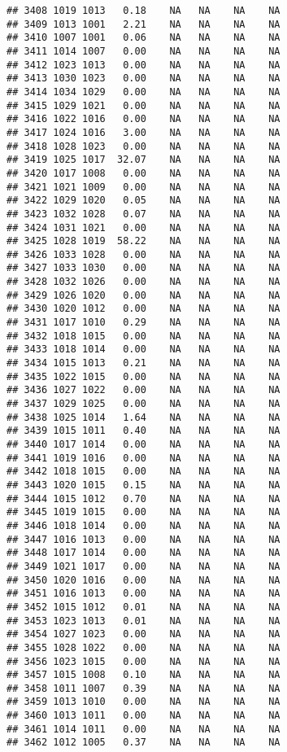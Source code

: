 \documentclass{article}\usepackage{graphicx, color}
\makeatletter
\newenvironment{kframe}{%
 \def\at@end@of@kframe{}%
 \ifinner\ifhmode%
  \def\at@end@of@kframe{\end{minipage}}%
  \begin{minipage}{\columnwidth}%
 \fi\fi%
 \def\FrameCommand##1{\hskip\@totalleftmargin \hskip-\fboxsep
 \colorbox{shadecolor}{##1}\hskip-\fboxsep
     \hskip-\linewidth \hskip-\@totalleftmargin \hskip\columnwidth}%
 \MakeFramed {\advance\hsize-\width
   \@totalleftmargin\z@ \linewidth\hsize
   \@setminipage}}%
 {\par\unskip\endMakeFramed%
 \at@end@of@kframe}
\newenvironment{knitrout}{}{} %
\makeatother
\begin{document}
\begin{knitrout}
\begin{kframe}
\begin{verbatim}
## 3408 1019 1013   0.18    NA   NA    NA    NA
## 3409 1013 1001   2.21    NA   NA    NA    NA
## 3410 1007 1001   0.06    NA   NA    NA    NA
## 3411 1014 1007   0.00    NA   NA    NA    NA
## 3412 1023 1013   0.00    NA   NA    NA    NA
## 3413 1030 1023   0.00    NA   NA    NA    NA
## 3414 1034 1029   0.00    NA   NA    NA    NA
## 3415 1029 1021   0.00    NA   NA    NA    NA
## 3416 1022 1016   0.00    NA   NA    NA    NA
## 3417 1024 1016   3.00    NA   NA    NA    NA
## 3418 1028 1023   0.00    NA   NA    NA    NA
## 3419 1025 1017  32.07    NA   NA    NA    NA
## 3420 1017 1008   0.00    NA   NA    NA    NA
## 3421 1021 1009   0.00    NA   NA    NA    NA
## 3422 1029 1020   0.05    NA   NA    NA    NA
## 3423 1032 1028   0.07    NA   NA    NA    NA
## 3424 1031 1021   0.00    NA   NA    NA    NA
## 3425 1028 1019  58.22    NA   NA    NA    NA
## 3426 1033 1028   0.00    NA   NA    NA    NA
## 3427 1033 1030   0.00    NA   NA    NA    NA
## 3428 1032 1026   0.00    NA   NA    NA    NA
## 3429 1026 1020   0.00    NA   NA    NA    NA
## 3430 1020 1012   0.00    NA   NA    NA    NA
## 3431 1017 1010   0.29    NA   NA    NA    NA
## 3432 1018 1015   0.00    NA   NA    NA    NA
## 3433 1018 1014   0.00    NA   NA    NA    NA
## 3434 1015 1013   0.21    NA   NA    NA    NA
## 3435 1022 1015   0.00    NA   NA    NA    NA
## 3436 1027 1022   0.00    NA   NA    NA    NA
## 3437 1029 1025   0.00    NA   NA    NA    NA
## 3438 1025 1014   1.64    NA   NA    NA    NA
## 3439 1015 1011   0.40    NA   NA    NA    NA
## 3440 1017 1014   0.00    NA   NA    NA    NA
## 3441 1019 1016   0.00    NA   NA    NA    NA
## 3442 1018 1015   0.00    NA   NA    NA    NA
## 3443 1020 1015   0.15    NA   NA    NA    NA
## 3444 1015 1012   0.70    NA   NA    NA    NA
## 3445 1019 1015   0.00    NA   NA    NA    NA
## 3446 1018 1014   0.00    NA   NA    NA    NA
## 3447 1016 1013   0.00    NA   NA    NA    NA
## 3448 1017 1014   0.00    NA   NA    NA    NA
## 3449 1021 1017   0.00    NA   NA    NA    NA
## 3450 1020 1016   0.00    NA   NA    NA    NA
## 3451 1016 1013   0.00    NA   NA    NA    NA
## 3452 1015 1012   0.01    NA   NA    NA    NA
## 3453 1023 1013   0.01    NA   NA    NA    NA
## 3454 1027 1023   0.00    NA   NA    NA    NA
## 3455 1028 1022   0.00    NA   NA    NA    NA
## 3456 1023 1015   0.00    NA   NA    NA    NA
## 3457 1015 1008   0.10    NA   NA    NA    NA
## 3458 1011 1007   0.39    NA   NA    NA    NA
## 3459 1013 1010   0.00    NA   NA    NA    NA
## 3460 1013 1011   0.00    NA   NA    NA    NA
## 3461 1014 1011   0.00    NA   NA    NA    NA
## 3462 1012 1005   0.37    NA   NA    NA    NA

\end{verbatim}
\end{kframe}
\end{knitrout}
\end{document}

